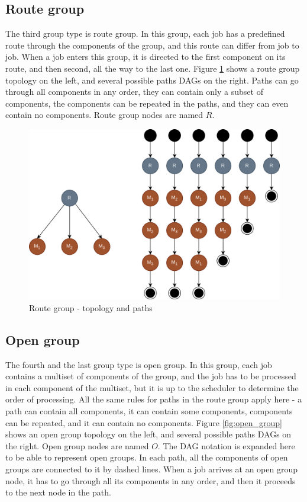 \subsection{Route group}

The third group type is route group. In this group, each job has a predefined route through the components of the group, and this route can differ from job to job. When a job enters this group, it is directed to the first component on its route, and then second, all the way to the last one. Figure \ref{fig:route_group} shows a route group topology on the left, and several possible paths DAGs on the right. Paths can go through all components in any order, they can contain only a subset of components, the components can be repeated in the paths, and they can even contain no components. Route group nodes are named $R$.

\begin{figure}[!htbp]
	\centering
	\includegraphics[scale=0.3]{../images/route_group.png}
	\caption{Route group - topology and paths}
    \label{fig:route_group}
\end{figure}

\subsection{Open group}

The fourth and the last group type is open group. In this group, each job contains a multiset of components of the group, and the job has to be processed in each component of the multiset, but it is up to the scheduler to determine the order of processing. All the same rules for paths in the route group apply here - a path can contain all components, it can contain some components, components can be repeated, and it can contain no components. Figure \ref{fig:open_group} shows an open group topology on the left, and several possible paths DAGs on the right. Open group nodes are named $O$. The DAG notation is expanded here to be able to represent open groups. In each path, all the components of open groups are connected to it by dashed lines. When a job arrives at an open group node, it has to go through all its components in any order, and then it proceeds to the next node in the path.

